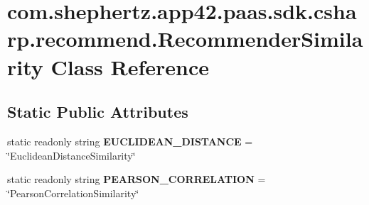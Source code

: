 \hypertarget{classcom_1_1shephertz_1_1app42_1_1paas_1_1sdk_1_1csharp_1_1recommend_1_1_recommender_similarity}{\section{com.\+shephertz.\+app42.\+paas.\+sdk.\+csharp.\+recommend.\+Recommender\+Similarity Class Reference}
\label{classcom_1_1shephertz_1_1app42_1_1paas_1_1sdk_1_1csharp_1_1recommend_1_1_recommender_similarity}
}
\subsection*{Static Public Attributes}
\begin{DoxyCompactItemize}
\item 
\hypertarget{classcom_1_1shephertz_1_1app42_1_1paas_1_1sdk_1_1csharp_1_1recommend_1_1_recommender_similarity_aa293b914b350288da0938355d420f3d0}{static readonly string {\bfseries E\+U\+C\+L\+I\+D\+E\+A\+N\+\_\+\+D\+I\+S\+T\+A\+N\+C\+E} = \char`\"{}Euclidean\+Distance\+Similarity\char`\"{}}\label{classcom_1_1shephertz_1_1app42_1_1paas_1_1sdk_1_1csharp_1_1recommend_1_1_recommender_similarity_aa293b914b350288da0938355d420f3d0}

\item 
\hypertarget{classcom_1_1shephertz_1_1app42_1_1paas_1_1sdk_1_1csharp_1_1recommend_1_1_recommender_similarity_a674479d0c4310719f4e54c76e5ea066f}{static readonly string {\bfseries P\+E\+A\+R\+S\+O\+N\+\_\+\+C\+O\+R\+R\+E\+L\+A\+T\+I\+O\+N} = \char`\"{}Pearson\+Correlation\+Similarity\char`\"{}}\label{classcom_1_1shephertz_1_1app42_1_1paas_1_1sdk_1_1csharp_1_1recommend_1_1_recommender_similarity_a674479d0c4310719f4e54c76e5ea066f}

\end{DoxyCompactItemize}
